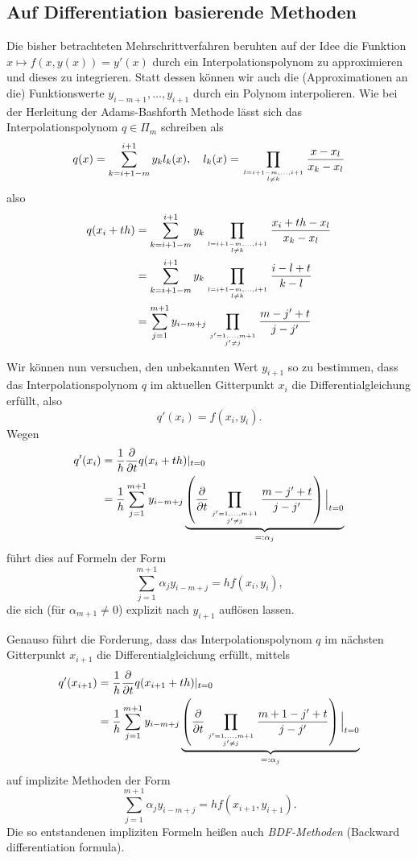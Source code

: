 \documentclass[12pt,a4paper]{book}
\theoremstyle{break}
\theoremstyle{nonumberplain}
\newcommand{\1}{\mathbbm{1}} 			      	%
\begin{document}
\subsection{Auf Differentiation basierende Methoden}

Die bisher betrachteten Mehrschrittverfahren beruhten auf der Idee die Funktion $x\mapsto f(x,y(x))=y'(x)$
durch ein Interpolationspolynom zu approximieren und dieses zu integrieren. 
Statt dessen können wir auch die (Approximationen an die) Funktionswerte
$y_{i-m+1},\ldots,y_{i+1}$ durch ein Polynom interpolieren. 
Wie bei der Herleitung der Adams-Bashforth Methode lässt sich das Interpolationspolynom 
$q\in \Pi_m$
schreiben als
\[
q(x)=\sum_{k=i+1-m}^{i+1} y_k l_k(x), \quad l_k(x)=\prod_{l=i+1-m,\ldots,i+1 \atop l\neq k} \frac{x-x_l}{x_k-x_l}
\]
also
\begin{align*}
q(x_i+th)& =\sum_{k=i+1-m}^{i+1} y_k \prod_{l=i+1-m,\ldots,i+1 \atop l\neq k} \frac{x_i + th -x_l}{x_k-x_l}\\
&=\sum_{k=i+1-m}^{i+1} y_k \prod_{l=i+1-m,\ldots,i+1 \atop l\neq k} \frac{i-l+t}{k-l}\\
&=\sum_{j=1}^{m+1} y_{i-m+j} \prod_{j'=1,\ldots,m+1 \atop j'\neq j} \frac{m-j'+t}{j-j'}
\end{align*}

Wir können nun versuchen, den unbekannten Wert $y_{i+1}$ so zu bestimmen, 
dass das Interpolationspolynom $q$ im aktuellen Gitterpunkt $x_i$ 
die Differentialgleichung erfüllt, also
\[
q'(x_i)=f(x_i,y_i).
\]
Wegen
\begin{align*}
q'(x_i)&=\frac{1}{h} \frac{\partial}{\partial t} q(x_i+th)|_{t=0}\\
&=\frac{1}{h} \sum_{j=1}^{m+1} y_{i-m+j} \underbrace{\left( \frac{\partial}{\partial t}  \prod_{j'=1,\ldots,m+1 \atop j'\neq j}
 \frac{m-j'+t}{j-j'}\right)\Big|_{t=0}}_{=:\alpha_j}
\end{align*}
führt dies auf Formeln der Form
\[
\sum_{j=1}^{m+1} \alpha_j  y_{i-m+j} = h f(x_i,y_i),
\]
die sich (für $\alpha_{m+1}\neq 0$) explizit nach $y_{i+1}$ auflösen lassen.

Genauso führt die Forderung, dass das Interpolationspolynom $q$ im nächsten Gitterpunkt $x_{i+1}$ 
die Differentialgleichung erfüllt, mittels
\begin{align*}
q'(x_{i+1})&=\frac{1}{h} \frac{\partial}{\partial t} q(x_{i+1}+th)|_{t=0}\\
&=\frac{1}{h} \sum_{j=1}^{m+1} y_{i-m+j} \underbrace{\left( \frac{\partial}{\partial t}  \prod_{j'=1,\ldots,m+1 \atop j'\neq j}
 \frac{m+1-j'+t}{j-j'}\right)\Big|_{t=0}}_{=:\alpha_j}
\end{align*}
auf implizite Methoden der Form
\[
\sum_{j=1}^{m+1} \alpha_j  y_{i-m+j} = h f(x_{i+1},y_{i+1}).
\]
Die so entstandenen impliziten Formeln heißen auch \emph{BDF-Methoden} (Backward differentiation formula).
\end{document}
